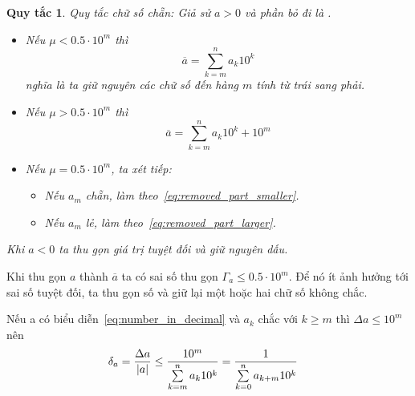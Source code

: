 \documentclass{book}
\newtheorem*{rule_of_thumb}{Quy tắc}
\DeclarePairedDelimiter\abs{\lvert}{\rvert}%
\begin{document}
\begin{rule_of_thumb}
Quy tắc chữ số chẵn: Giả sử \(a > 0\) và phần bỏ đi là \mu.

\begin{itemize}
    \item Nếu \(\mu < \num{0.5} \cdot 10^m\) thì
        \begin{equation}\label{eq:removed_part_smaller}
            \overline{a} = \sum_{k=m}^{n} a_k 10^k
        \end{equation}
        nghĩa là ta giữ nguyên các chữ số đến hàng \(m\) tính từ trái sang phải.
    \item Nếu \(\mu > \num{0.5} \cdot 10^m\) thì
        \begin{equation}\label{eq:removed_part_larger}
            \overline{a} = \sum_{k=m}^{n} a_k 10^k + 10^m
        \end{equation}
    \item Nếu \(\mu = \num{0.5} \cdot 10^m\), ta xét tiếp:
        \begin{itemize}
            \item Nếu \(a_m\) chẵn, làm theo~\ref{eq:removed_part_smaller}.
            \item Nếu \(a_m\) lẻ, làm theo~\ref{eq:removed_part_larger}.
        \end{itemize}
\end{itemize}

Khi \(a < 0\) ta thu gọn giá trị tuyệt đối và giữ nguyên dấu.
\end{rule_of_thumb}

Khi thu gọn \(a\) thành \(\overline{a}\) ta có sai số thu gọn \(\Gamma_a \leq
\num{0.5} \cdot 10^m\). Để nó ít ảnh hưởng tới sai số tuyệt đối, ta thu gọn số
và giữ lại một hoặc hai chữ số không chắc.

Nếu a có biểu diễn~\ref{eq:number_in_decimal} và \(a_k\) chắc với \(k \geq m\)
thì \(\Delta a \leq 10^m\) nên
\[\begin{aligned}
    \delta_a = \frac{\Delta a}{\abs{a}} \leq \frac{10^m}{\sum\limits_{k=m}\limits^{n} a_k 10^k} &= \frac{1}{\sum\limits_{k=0}\limits^{n} a_{k+m} 10^k}
\end{aligned}\]
\end{document}
